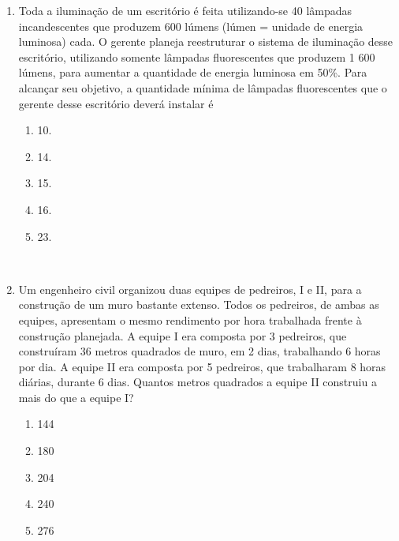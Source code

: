 \begin{enumerate}
	\newpage
	 \\
	
	
	\item Toda a iluminação de um escritório é feita utilizando-se 40 lâmpadas incandescentes que produzem 600 lúmens (lúmen = unidade de energia luminosa) cada. O gerente planeja reestruturar o sistema de iluminação desse escritório, utilizando somente lâmpadas fluorescentes que produzem 1 600 lúmens, para aumentar a quantidade de energia luminosa em 50\%. Para alcançar seu objetivo, a quantidade mínima de lâmpadas fluorescentes que o gerente desse escritório deverá instalar é
	
	\begin{enumerate}
		\item 10.
		\item 14.
		\item 15.
		\item 16.
		\item 23.		
	\end{enumerate}
	
		\newpage
	 \\
	
	
	\item Um engenheiro civil organizou duas equipes de pedreiros, I e II, para a construção de um muro bastante extenso. Todos os pedreiros, de ambas as equipes, apresentam o mesmo rendimento por hora trabalhada frente à construção planejada. A equipe I era composta por 3 pedreiros, que construíram 36 metros quadrados de muro, em 2 dias, trabalhando 6 horas por dia. A equipe II era composta por 5 pedreiros, que trabalharam 8 horas diárias, durante 6 dias. 	Quantos metros quadrados a equipe II construiu a mais do que a equipe I?
	
	\begin{enumerate}
		\item 144
		\item 180
		\item 204
		\item 240
		\item 276
	\end{enumerate}

\end{enumerate}


